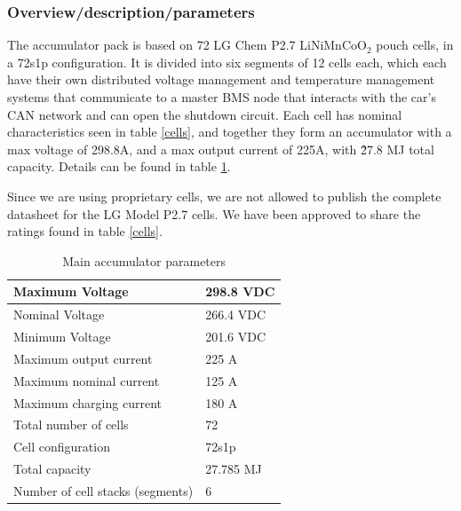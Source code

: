 \documentclass{article}
\begin{document}
\subsubsection{Overview/description/parameters}\label{accumulator_overview}

The accumulator pack is based on 72 LG Chem P2.7 LiNiMnCoO$_{2}$ pouch cells, in a 72s1p configuration. It is divided into six segments of 12 cells each, which each have their own distributed voltage management and temperature management systems that communicate to a master BMS node that interacts with the car's CAN network and can open the shutdown circuit. Each cell has nominal characteristics seen in table \ref{cells}, and together they form an accumulator with a max voltage of 298.8A, and a max output current of 225A, with \~27.8 MJ total capacity. Details can be found in table \ref{batterytable}. 

Since we are using proprietary cells, we are not allowed to publish the complete datasheet for the LG Model P2.7 cells. We have been approved to share the ratings found in table \ref{cells}. 


	\begin{table}[H]
	    \centering
	    \begin{tabular}{|l|l|}
	        \hline
	        Maximum Voltage & 298.8 VDC \\ \hline
	        Nominal Voltage & 266.4 VDC \\ \hline
	        Minimum Voltage & 201.6 VDC \\ \hline
	        Maximum output current & 225 A \\ \hline
	        Maximum nominal current & 125 A \\ \hline
	        Maximum charging current & 180 A \\ \hline
	        Total number of cells & 72 \\ \hline
	        Cell configuration & 72s1p \\ \hline
	        Total capacity & 27.785 MJ \\ \hline
	        Number of cell stacks (segments) & 6 \\ \hline
	    \end{tabular}
	    \caption{Main accumulator parameters}
	    \label{batterytable}
	\end{table}
\end{document}
